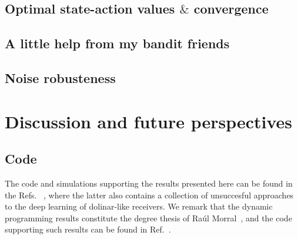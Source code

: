 \subsection{Optimal state-action values $\&$ convergence}\label{ssec:optVal}

\subsection{A little help from my bandit friends}\label{ssec:rlcoh_dolinar_plus_bandit}

\subsection{Noise robusteness}\label{ssec:rlcoh_noise}

\section{Discussion and future perspectives}\label{ssec:rlcoh_outlook}

\subsection{Code}
The code and simulations supporting the results presented here can be found in the Refs. ~\cite{marek,deeper}, where the latter also contains a collection of unsuccesful approaches to the deep learning of dolinar-like receivers. We remark that the dynamic programming results constitute the degree thesis of Raúl Morral~\cite{raultfg}, and the code supporting such results can be found in Ref.~\cite{dynamo}.
